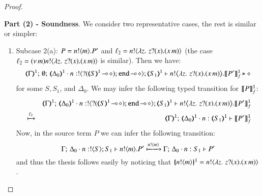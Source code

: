 \begin{proof}
\begin{enumerate}[1.]

%
		
\end{enumerate}
%
\noi \textbf{Part (2) - Soundness}. We consider two representative cases, the rest is similar or simpler:
%
\begin{enumerate}[1.]
	\item Subcase 2(a): $P = n ! \langle m \rangle . P'$ and $\ell_2 = n ! \langle \lambda z.\,\,z ? (x) . (x\, {m}) \rangle$
	(the case $\ell_2 = (\nu\, m)n ! \langle \lambda z.\,\,z ? (x) . (x\, {m}) \rangle$ is similar).
		Then 
		we have: %
%
		\[
			\tmap{\Gamma}{1};\, \emptyset;\, \tmap{\Delta_0}{1} \cat 
			n: \btout{\lhot{\btinp{\lhot{\tmap{S}{1}}}\tinact}} \tmap{S_1}{1} 
			\proves 
			 \bbout{n}{ \abs{z}{\,\binp{z}{x} (\appl{x}{m})} } \pmapp{P'}{1}{f} 
			 \hastype \Proc
		\]
%
		for some $S, S_1$, and $\Delta_0$. 
		We may infer the following typed transition for $\llbracket P\rrbracket^\mathtt{1}_f$:
%
		\begin{eqnarray*}
			& & \tmap{\Gamma}{1};\, \tmap{\Delta_0}{1} \cat n: \btout{\lhot{\btinp{\lhot{\tmap{S}{1}}}\tinact}} \tmap{S_1}{1} 
			\proves 
			 \bbout{n}{ \abs{z}{\,\binp{z}{x} (\appl{x}{m})} } \pmapp{P'}{1}{f} 
			 \\
			&\hby{\ell_2}& 
			\tmap{\Gamma}{1};\, \tmap{\Delta_0}{1} \cat n: \tmap{S_1}{1} 
			\proves  \pmapp{P'}{1}{f} 
		\end{eqnarray*}
%
		Now, in the source term $P$ we can infer the following transition: 
%
		\[
		\Gamma;\,  \Delta_0 \cdot n:! \langle S \rangle ; S_1 \vdash n ! \langle m \rangle . P'
		 \xmapsto{n !\langle m \rangle} 
		 \Gamma;\,  \Delta_0 \cdot n: S_1 \vdash P'
		\]
%
		and thus the thesis follows easily by noticing that 
		$\{\!\!\{n ! \langle m \rangle\}\!\!\}^{\mathtt{1}} = n ! \langle \lambda z.\,\,z ? (x) . (x\, {m}) \rangle$.



\end{enumerate}
\end{proof}
